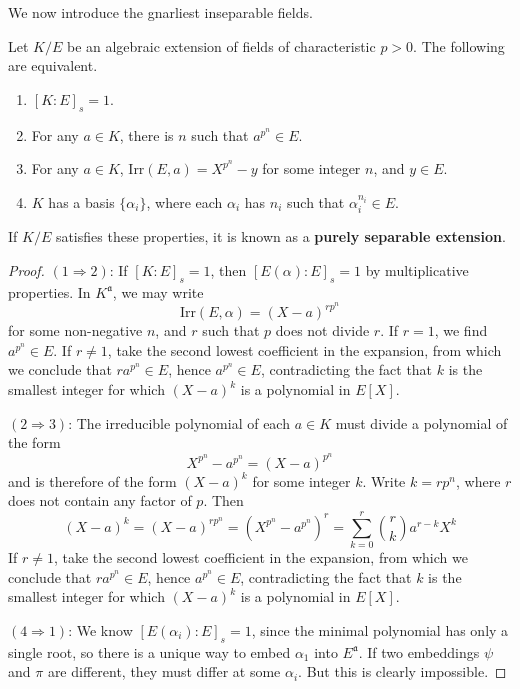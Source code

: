 We now introduce the gnarliest inseparable fields.

\begin{theorem}
    Let $K/E$ be an algebraic extension of fields of characteristic $p > 0$. The following are equivalent.
    \begin{enumerate}
        \item $[K:E]_s = 1$.
        \item For any $a \in K$, there is $n$ such that $a^{p^n} \in E$.
        \item For any $a \in K$, $\text{Irr}(E, a) = X^{p^n} - y$ for some integer $n$, and $y \in E$.
        \item $K$ has a basis $\{ \alpha_i \}$, where each $\alpha_i$ has $n_i$ such that $\alpha_i^{n_i} \in E$.
    \end{enumerate}
    If $K/E$ satisfies these properties, it is known as a {\bf purely separable extension}.
\end{theorem}
\begin{proof}
    $(1 \Rightarrow 2)$: If $[K:E]_s = 1$, then $[E(\alpha): E]_s = 1$ by multiplicative properties. In $K^{\mathfrak{a}}$, we may write
    \[ \text{Irr}(E, \alpha) = (X - a)^{rp^n} \]
    for some non-negative $n$, and $r$ such that $p$ does not divide $r$. If $r = 1$, we find $a^{p^n} \in E$. If $r \neq 1$, take the second lowest coefficient in the expansion, from which we conclude that $r a^{p^n} \in E$, hence $a^{p^n} \in E$, contradicting the fact that $k$ is the smallest integer for which $(X - a)^k$ is a polynomial in $E[X]$.

    $(2 \Rightarrow 3)$: The irreducible polynomial of each $a \in K$ must divide a polynomial of the form
    \[ X^{p^n} - a^{p^n} = (X - a)^{p^n} \]
    and is therefore of the form $(X - a)^k$ for some integer $k$. Write $k = rp^n$, where $r$ does not contain any factor of $p$. Then
    \[ (X - a)^k = (X - a)^{rp^n} = (X^{p^n} - a^{p^n})^r = \sum_{k = 0}^r \binom{r}{k} a^{r-k} X^k \]
    If $r \neq 1$, take the second lowest coefficient in the expansion, from which we conclude that $r a^{p^n} \in E$, hence $a^{p^n} \in E$, contradicting the fact that $k$ is the smallest integer for which $(X - a)^k$ is a polynomial in $E[X]$.

    $(4 \Rightarrow 1)$: We know $[E(\alpha_i):E]_s = 1$, since the minimal polynomial has only a single root, so there is a unique way to embed $\alpha_1$ into $E^{\mathfrak{a}}$. If two embeddings $\psi$ and $\pi$ are different, they must differ at some $\alpha_i$. But this is clearly impossible.
\end{proof}

